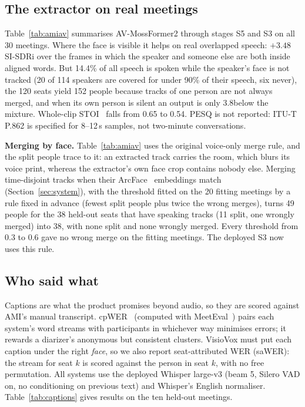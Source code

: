 \subsection{The extractor on real meetings}
Table~\ref{tab:amiav} summarises AV-MossFormer2 through stages S5 and S3 on all 30 meetings. Where the face is visible it helps on real overlapped speech: $+3.48$\dB SI-SDRi over the frames in which the speaker and someone else are both inside aligned words. But 14.4\% of all speech is spoken while the speaker's face is not tracked (20 of 114 speakers are covered for under 90\% of their speech, six never), the 120 seats yield 152 people because tracks of one person are not always merged, and when its own person is silent an output is only 3.8\dB below the mixture. Whole-clip STOI~\cite{taal2011stoi} falls from 0.65 to 0.54. PESQ is not reported: ITU-T P.862 is specified for 8--12\,s samples, not two-minute conversations.

\textbf{Merging by face.} Table~\ref{tab:amiav} uses the original voice-only merge rule, and the split people trace to it: an extracted track carries the room, which blurs its voice print, whereas the extractor's own face crop contains nobody else. Merging time-disjoint tracks when their ArcFace~\cite{deng2019arcface} embeddings match (Section~\ref{sec:system}), with the threshold fitted on the 20 fitting meetings by a rule fixed in advance (fewest split people plus twice the wrong merges), turns 49 people for the 38 held-out seats that have speaking tracks (11 split, one wrongly merged) into 38, with none split and none wrongly merged. Every threshold from 0.3 to 0.6 gave no wrong merge on the fitting meetings. The deployed S3 now uses this rule.

\begin{table}[t]
\centering
\caption{AV-MossFormer2 (S5+S3) on 30 AMI-AV meetings. SI-SDRi (dB) with 95\% bootstrap intervals.}
\label{tab:amiav}
\footnotesize
\setlength{\tabcolsep}{3pt}

\end{table}

\subsection{Who said what}
Captions are what the product promises beyond audio, so they are scored against AMI's manual transcript. cpWER~\cite{watanabe2020chime6} (computed with MeetEval~\cite{vonneumann2023meeteval}) pairs each system's word streams with participants in whichever way minimises errors; it rewards a diarizer's anonymous but consistent clusters. VisioVox must put each caption under the right \emph{face}, so we also report seat-attributed WER (saWER): the stream for seat $k$ is scored against the person in seat $k$, with no free permutation. All systems use the deployed Whisper large-v3 (beam 5, Silero VAD on, no conditioning on previous text) and Whisper's English normaliser. Table~\ref{tab:captions} gives results on the ten held-out meetings.

